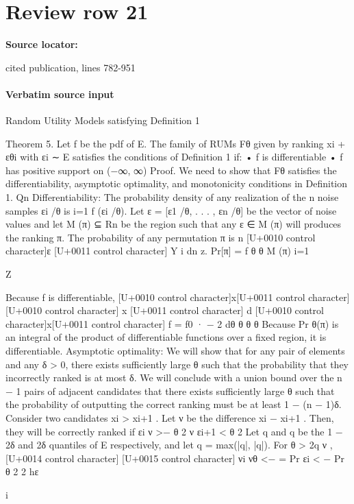 \documentclass[10pt]{article}
\begin{document}
\section*{Review row 21}
\textbf{Source locator:} {\footnotesize\raggedright cited publication, lines 782-\allowbreak{}951\par}
\paragraph{Verbatim source input}
\begin{ReviewVerbatim}
Random Utility Models satisfying Definition 1

Theorem 5. Let f be the pdf of E. The family of RUMs Fθ given by ranking xi + εθi with εi ∼ E satisfies
the conditions of Definition 1 if:
• f is differentiable
• f has positive support on (−∞, ∞)
Proof. We need to show that Fθ satisfies the differentiability, asymptotic optimality, and monotonicity
conditions in Definition 1.
Qn
Differentiability: The probability density of any realization of the n noise samples εi /θ is i=1 f (εi /θ).
Let ε = [ε1 /θ, . . . , εn /θ] be the vector of noise values and let M (π) ⊆ Rn be the region such that any ε ∈ M (π)
will produces the ranking π. The probability of any permutation π is
n
[U+0010 control character]ε [U+0011 control character]
Y
i
dn z.
Pr[π] =
f
θ
θ
M (π) i=1

Z

Because f is differentiable,
[U+0010 control character]x[U+0011 control character] [U+0010 control character] x [U+0011 control character]
d [U+0010 control character]x[U+0011 control character]
f
= f0
· − 2
dθ
θ
θ
θ
Because Pr θ(π) is an integral of the product of differentiable functions over a fixed region, it is differentiable.
Asymptotic optimality: We will show that for any pair of elements and any δ > 0, there exists
sufficiently large θ such that the probability that they incorrectly ranked is at most δ. We will conclude with
a union bound over the n − 1 pairs of adjacent candidates that there exists sufficiently large θ such that the
probability of outputting the correct ranking must be at least 1 − (n − 1)δ.
Consider two candidates xi > xi+1 . Let ν be the difference xi − xi+1 . Then, they will be correctly ranked
if
εi
ν
>−
θ
2
ν
εi+1
<
θ
2
Let q and q be the 1 − 2δ and 2δ quantiles of E respectively, and let q = max(|q|, |q|). For θ > 2q
ν ,
[U+0014 control character]
[U+0015 control character]
νi
νθ
<−
= Pr εi < −
Pr
θ
2
2
hε

i


\end{ReviewVerbatim}
\end{document}
